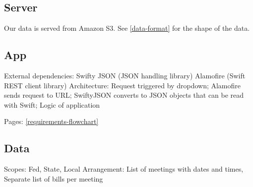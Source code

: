\subsection{Server}
Our data is served from Amazon S3. See \vref{data-format} for the shape of the
data.

\subsection{App}
External dependencies: 
    Swifty JSON (JSON handling library)
    Alamofire (Swift REST client library)
Architecture:
    Request triggered by dropdown;
    Alamofire sends request to URL;
    SwiftyJSON converts to JSON objects that can be read with Swift;
    Logic of application

Pages:
    \vref{requirements-flowchart}

\subsection{Data}
\label{data-format}
Scopes: Fed, State, Local
Arrangement: 
    List of meetings with dates and times, 
    Separate list of bills per meeting

